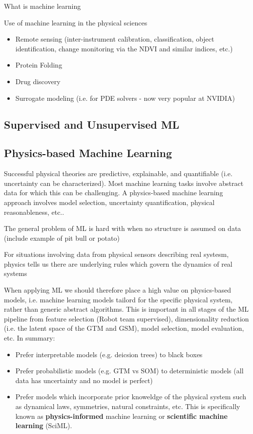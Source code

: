 What is machine learning

Use of machine learning in the physical sciences

\begin{itemize}
  \item Remote sensing (inter-instrument calibration, classification, object identification, change monitoring via the NDVI and similar indices, etc.)
  \item Protein Folding
  \item Drug discovery
  \item Surrogate modeling (i.e. for PDE solvers - now very popular at NVIDIA)
\end{itemize}


\subsection{Supervised and Unsupervised ML}


\subsection{Physics-based Machine Learning}

Successful physical theories are predictive, explainable, and quantifiable (i.e.
uncertainty can be characterized). Most machine learning tasks involve abstract
data for which this can be challenging. A physics-based machine learning
approach involves model selection, uncertainty quantification, physical
reasonableness, etc..


The general problem of ML is hard with when no structure is assumed on data (include example of pit bull or potato)

For situations involving data from physical sensors describing real systesm, physics tells us there are underlying rules which govern the dynamics of real systems

When applying ML we should therefore place a high value on physics-based models, i.e. machine learning models tailord for the specific physical system, rather than generic abstract algorithms. This is important in all stages of the ML pipeline from feature selection (Robot team supervised), dimensionality reduction (i.e. the latent space of the GTM and GSM), model selection, model evaluation, etc. In summary:

\begin{itemize}
  \item Prefer interpretable models (e.g. deicsion trees) to black boxes
  \item Prefer probabilistic models (e.g. GTM vs SOM) to deterministic models (all data has uncertainty and no model is perfect)
  \item Prefer models which incorporate prior knoweldge of the physical system such as dynamical laws, symmetries, natural constraints, etc. This is specifically known as \textbf{physics-informed} machine learning or \textbf{scientific machine learning}  (SciML).
\end{itemize}



